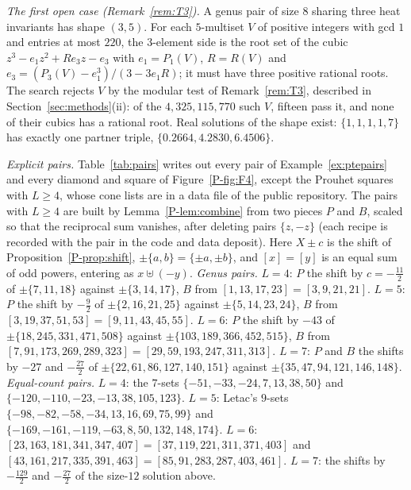 \documentclass[pdflatex,sn-mathphys-num]{sn-jnl}
\newcommand{\pref}[1]{\ref*{P-#1}}%
\theoremstyle{thmstyleone}%
\theoremstyle{thmstylethree}%
\begin{document}
\emph{The first open case (Remark~\ref{rem:T3}).} A genus pair of size $8$ sharing three heat invariants has shape $(3,5)$. For each $5$-multiset $V$ of positive integers with gcd $1$ and entries at most $220$, the $3$-element side is the root set of the cubic $z^3-e_1z^2+Re_3z-e_3$ with $e_1=P_1(V)$, $R=R(V)$ and $e_3=(P_3(V)-e_1^3)/(3-3e_1R)$; it must have three positive rational roots. The search rejects $V$ by the modular test of Remark~\ref{rem:T3}, described in Section~\ref{sec:methods}(ii): of the $4{,}325{,}115{,}770$ such $V$, fifteen pass it, and none of their cubics has a rational root. Real solutions of the shape exist: $\{1,1,1,1,7\}$ has exactly one partner triple, $\{0.2664,4.2830,6.4506\}$.

\emph{Explicit pairs.} Table~\ref{tab:pairs} writes out every pair of Example~\ref{ex:ptepairs} and every diamond and square of Figure~\pref{fig:F4}, except the Prouhet squares with $L\ge4$, whose cone lists are in a data file of the public repository. The pairs with $L\ge4$ are built by Lemma~\pref{lem:combine} from two pieces $P$ and $B$, scaled so that the reciprocal sum vanishes, after deleting pairs $\{z,-z\}$ (each recipe is recorded with the pair in the code and data deposit). Here $X\pm c$ is the shift of Proposition~\pref{prop:shift}, $\pm\{a,b\}=\{\pm a,\pm b\}$, and $[x]=[y]$ is an equal sum of odd powers, entering as $x\uplus(-y)$. \emph{Genus pairs.} $L=4$: $P$ the shift by $c=-\frac{11}2$ of $\pm\{7,11,18\}$ against $\pm\{3,14,17\}$, $B$ from $[1,13,17,23]=[3,9,21,21]$. $L=5$: $P$ the shift by $-\frac92$ of $\pm\{2,16,21,25\}$ against $\pm\{5,14,23,24\}$, $B$ from $[3,19,37,51,53]=[9,11,43,45,55]$. $L=6$: $P$ the shift by $-43$ of $\pm\{18,245,331,471,508\}$ against $\pm\{103,189,366,452,515\}$, $B$ from $[7,91,173,269,289,323]=[29,59,193,247,311,313]$. $L=7$: $P$ and $B$ the shifts by $-27$ and $-\frac{27}2$ of $\pm\{22,61,86,127,140,151\}$ against $\pm\{35,47,94,121,146,148\}$. \emph{Equal-count pairs.} $L=4$: the $7$-sets $\{-51,-33,-24,7,13,38,50\}$ and $\{-120,-110,-23,-13,38,105,123\}$. $L=5$: Letac's $9$-sets $\{-98,-82,-58,-34,13,16,69,75,99\}$ and $\{-169,-161,-119,-63,8,50,132,148,174\}$. $L=6$: $[23,163,181,341,347,407]=[37,119,221,311,371,403]$ and $[43,161,217,335,391,463]=[85,91,283,287,403,461]$. $L=7$: the shifts by $-\frac{129}2$ and $-\frac{27}2$ of the size-$12$ solution above.
\end{document}
